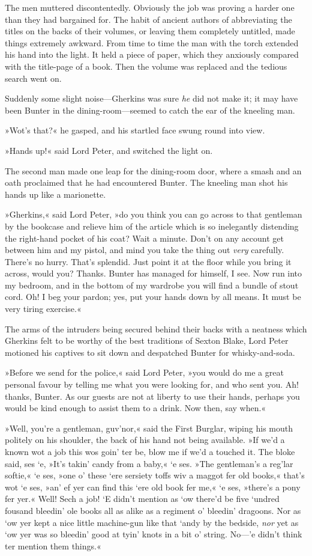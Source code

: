The men muttered discontentedly. Obviously the job was proving a harder one than they had bargained for. The habit of ancient authors of abbreviating the titles on the backs of their volumes, or leaving them completely untitled, made things extremely awkward. From time to time the man with the torch extended his hand into the light. It held a piece of paper, which they anxiously compared with the title-page of a book. Then the volume was replaced and the tedious search went on.

Suddenly some slight noise—Gherkins was sure \textit{he} did not make it; it may have been Bunter in the dining-room—seemed to catch the ear of the kneeling man.

»Wot's that?« he gasped, and his startled face swung round into view.

»Hands up!« said Lord Peter, and switched the light on.

The second man made one leap for the dining-room door, where a smash and an oath proclaimed that he had encountered Bunter. The kneeling man shot his hands up like a marionette.

»Gherkins,« said Lord Peter, »do you think you can go across to that gentleman by the bookcase and relieve him of the article which is so inelegantly distending the right-hand pocket of his coat? Wait a minute. Don't on any account get between him and my pistol, and mind you take the thing out \textit{very} carefully. There's no hurry. That's splendid. Just point it at the floor while you bring it across, would you? Thanks. Bunter has managed for himself, I see. Now run into my bedroom, and in the bottom of my wardrobe you will find a bundle of stout cord. Oh! I beg your pardon; yes, put your hands down by all means. It must be very tiring exercise.«

The arms of the intruders being secured behind their backs with a neatness which Gherkins felt to be worthy of the best traditions of Sexton Blake, Lord Peter motioned his captives to sit down and despatched Bunter for whisky-and-soda.

»Before we send for the police,« said Lord Peter, »you would do me a great personal favour by telling me what you were looking for, and who sent you. Ah! thanks, Bunter. As our guests are not at liberty to use their hands, perhaps you would be kind enough to assist them to a drink. Now then, say when.«

»Well, you're a gentleman, guv'nor,« said the First Burglar, wiping his mouth politely on his shoulder, the back of his hand not being available. »If we'd a known wot a job this wos goin' ter be, blow me if we'd a touched it. The bloke said, ses `e, »It's takin' candy from a baby,« `e ses. »The gentleman's a reg'lar softie,« `e ses, »one o' these `ere sersiety toffs wiv a maggot fer old books,« that's wot `e ses, »an' ef yer can find this `ere old book fer me,« `e ses, »there's a pony fer yer.« Well! Sech a job! `E didn't mention as `ow there'd be five `undred fousand bleedin' ole books all as alike as a regiment o' bleedin' dragoons. Nor as `ow yer kept a nice little machine-gun like that `andy by the bedside, \textit{nor} yet as `ow yer was so bleedin' good at tyin' knots in a bit o' string. No—'e didn't think ter mention them things.«

